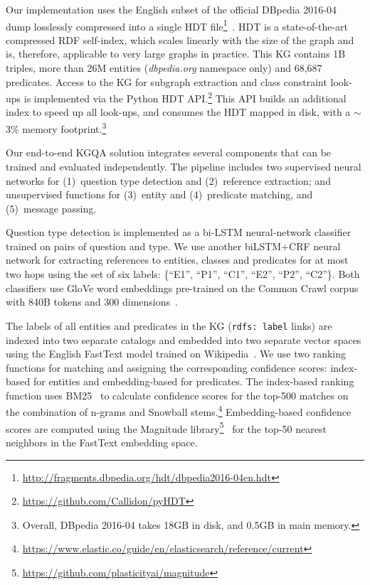 Our implementation uses the English subset of the official DBpedia 2016-04 dump losslessly compressed into a single HDT file\footnote{\url{http://fragments.dbpedia.org/hdt/dbpedia2016-04en.hdt}}~\cite{FMPGPA:13}.
HDT is a state-of-the-art compressed RDF self-index, which scales linearly with the size of the graph and is, therefore, applicable to very large graphs in practice.
This KG contains 1B triples, more than 26M entities (\emph{dbpedia.org} namespace only) and 68,687 predicates.
Access to the KG for subgraph extraction and class constraint look-ups is implemented via the Python HDT API.\footnote{\url{https://github.com/Callidon/pyHDT}}
This API builds an additional index \cite{martinez2012exchange} to speed up all look-ups, and consumes the HDT mapped in disk, with a ${\sim}$3\% memory footprint.\footnote{Overall, DBpedia 2016-04 takes 18GB in disk, and 0.5GB in main memory.}

Our end-to-end KGQA solution integrates several components that can be trained and evaluated independently.
The pipeline includes two supervised neural networks for (1)~question type detection and (2)~reference extraction; and unsupervised functions for (3)~entity and (4)~predicate matching, and (5)~message passing.

Question type detection is implemented as a bi-LSTM neural-network classifier trained on pairs of question and type.
We use another biLSTM+CRF neural network for extracting references to entities, classes and predicates for at most two hops using the set of six labels: \{``E1'', ``P1'', ``C1'', ``E2'', ``P2'', ``C2''\}.
Both classifiers use GloVe word embeddings pre-trained on the Common Crawl corpus with 840B tokens and 300 dimensions~\cite{pennington2014glove}. 

The labels of all entities and predicates in the KG (\texttt{\small rdfs: label} links) are indexed into two separate catalogs and embedded into two separate vector spaces using the English FastText model trained on Wikipedia~\cite{bojanowski2017enriching}.
We use two ranking functions for matching and assigning the corresponding confidence scores: index-based for entities and embedding-based for predicates.
The index-based ranking function uses BM25~\cite{manning2010introduction} to calculate confidence scores for the top-500 matches on the combination of n-grams and Snowball stems.\footnote{
    \url{https://www.elastic.co/guide/en/elasticsearch/reference/current}}
Embedding-based confidence scores are computed using the Magnitude library\footnote{\url{https://github.com/plasticityai/magnitude}}~\cite{patel2018magnitude} for the top-50 nearest neighbors in the FastText embedding space.

